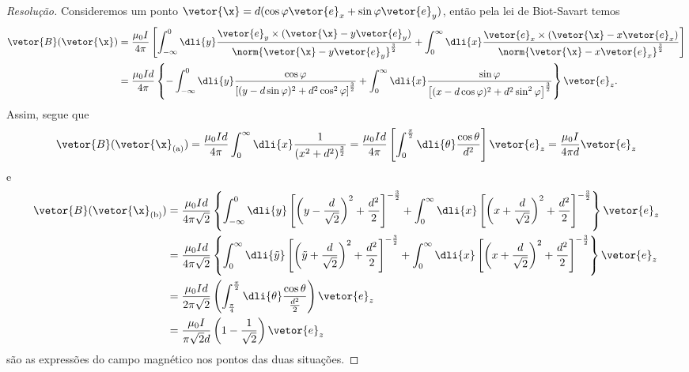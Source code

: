 \begin{proof}[Resolução]
    Consideremos um ponto \(\vetor{\x} = d(\cos\varphi \vetor{e}_x + \sin\varphi \vetor{e}_y)\), então pela lei de Biot-Savart temos
    \begin{align*}
        \vetor{B}(\vetor{\x}) &= \frac{\mu_0I}{4\pi} \left[\int_{-\infty}^0\dli{y} \frac{\vetor{e}_y \times (\vetor{\x} -y\vetor{e}_y)}{\norm{\vetor{\x} - y\vetor{e}_y}^{\frac32}} + \int_{0}^\infty \dli{x}\frac{\vetor{e}_x \times (\vetor{\x} - x\vetor{e}_x)}{\norm{\vetor{\x} - x\vetor{e}_x}^{\frac32}}\right]\\
                              &= \frac{\mu_0 I d}{4\pi} \left\{-\int_{-\infty}^0\dli{y}\frac{\cos\varphi}{\left[(y - d\sin\varphi)^2 + d^2\cos^2\varphi\right]^{\frac32}} + \int_0^\infty\dli{x} \frac{\sin\varphi}{\left[(x - d\cos\varphi)^2 + d^2 \sin^2\varphi\right]^{\frac32}}\right\}\vetor{e}_z.
    \end{align*}
    Assim, segue que
    \begin{equation*}
        \vetor{B}(\vetor{\x}_{\mathrm{(a)}}) = \frac{\mu_0 I d}{4\pi} \int_0^\infty\dli{x}\frac{1}{(x^2 + d^2)^{\frac32}} = \frac{\mu_0 I d}{4\pi}\left[\int_{0}^{\frac{\pi}{2}}\dli{\theta} \frac{\cos\theta}{d^2}\right] \vetor{e}_z= \frac{\mu_0 I}{4\pi d} \vetor{e}_z
    \end{equation*}
    e
    \begin{align*}
        \vetor{B}(\vetor{\x}_\mathrm{(b)}) &= \frac{\mu_0 I d}{4\pi\sqrt{2}} \left\{\int_{-\infty}^0\dli{y}\left[\left(y - \frac{d}{\sqrt{2}}\right)^2 + \frac{d^2}{2}\right]^{-\frac32} + \int_0^{\infty}\dli{x}\left[\left(x + \frac{d}{\sqrt{2}}\right)^2 + \frac{d^2}{2}\right]^{-\frac32}\right\}\vetor{e}_z\\
                                           &= \frac{\mu_0 I d}{4\pi\sqrt{2}} \left\{\int_0^{\infty}\dli{\tilde{y}}\left[\left(\tilde{y} + \frac{d}{\sqrt{2}}\right)^2 + \frac{d^2}{2}\right]^{-\frac32} + \int_0^{\infty}\dli{x}\left[\left(x + \frac{d}{\sqrt{2}}\right)^2 + \frac{d^2}{2}\right]^{-\frac32}\right\}\vetor{e}_z\\
                                           &= \frac{\mu_0 I d}{2\pi \sqrt{2}} \left(\int_{\frac\pi4}^{\frac\pi2}\dli{\theta} \frac{\cos\theta}{\frac{d^2}{2}}\right)\vetor{e}_z\\
                                           &= \frac{\mu_0 I}{\pi \sqrt{2}d} \left(1 - \frac{1}{\sqrt{2}}\right)\vetor{e}_z
    \end{align*}
    são as expressões do campo magnético nos pontos das duas situações.
\end{proof}
